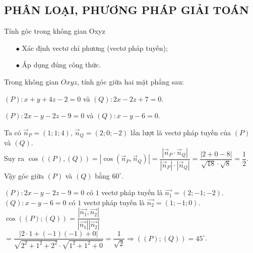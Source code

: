 \subsection{PHÂN LOẠI, PHƯƠNG PHÁP GIẢI TOÁN}
\begin{dang}{Tính góc trong không gian Oxyz}
	\begin{itemize}
		\item [$\bullet$] Xác định vectơ chỉ phương (vectơ pháp tuyến);
		\item [$\bullet$] Áp dụng đúng công thức.
	\end{itemize}
\end{dang}
\setcounter{vd}{0}
\begin{vd}
	Trong không gian $Oxyz$, tính góc giữa hai mặt phẳng sau:
	\begin{enumEX}[a)]{1}
		\item $(P)\colon x+y+4z-2=0$ và $(Q)\colon 2x-2z+7=0$.
		\item $(P)\colon 2x - y-2z-9=0$ và $(Q)\colon  x - y - 6=0$.
	\end{enumEX}
	\loigiai
	{
	\begin{enumEX}[a)]{1}
		\item Ta có $\vec{n}_P=(1;1;4)$, $\vec{n}_Q=(2;0;-2)$ lần lượt là vectơ pháp tuyến của $(P)$ và $(Q)$.\\
		Suy ra $\cos\left((P),(Q)\right)=|\cos\left(\vec{n}_P,\vec{n}_Q\right)|=\dfrac{|\vec{n}_P\cdot \vec{n}_Q|}{|\vec{n}_P|\cdot |\vec{n}_Q|}=\dfrac{|2+0-8|}{\sqrt{18}\cdot \sqrt{8}}=\dfrac{1}{2}$.\\
		Vậy góc giữa $(P)$ và $(Q)$ bằng $60^\circ$.
		\item $(P)\colon 2x - y-2z-9=0$ có $1$ vectơ pháp tuyến là $\overrightarrow{n_1} = (2;-1;-2)$.\\
		$(Q)\colon  x - y - 6=0$ có $1$ vectơ pháp tuyến là $\overrightarrow{n_2} = (1;-1;0)$.\\
		$\cos \left(\left( P \right);\left( Q \right)\right) = \dfrac{\left|\overrightarrow{n_1}, \overrightarrow{n_2}\right|}{\left|\overrightarrow{n_1}\right|\left|\overrightarrow{n_2}\right|} $
		$= \dfrac{\left|2\cdot 1 + \left(- 1\right)\left(- 1\right) + 0\right|}{\sqrt{2^2 + 1^2 + 2^2}\cdot \sqrt{1^2+ 1^2 + 0}}= \dfrac{1}{\sqrt{2}} \Rightarrow \left(\left( P \right);\left( Q \right)\right) = 45^\circ$.
	\end{enumEX}
	}
\end{vd}
